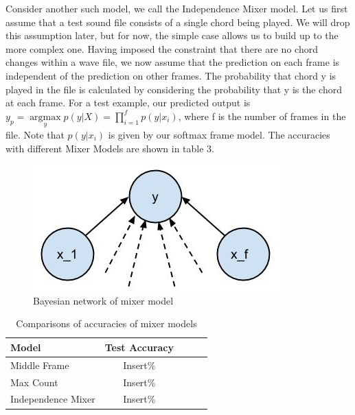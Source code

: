 \documentclass{article}
\begin{document}
Consider another such model, we call the Independence Mixer model. Let us first assume that a test sound file consists of a single chord being played. We will drop this assumption later, but for now, the simple case allows us to build up to the more complex one. Having imposed the constraint that there are no chord changes within a wave file, we now assume that the prediction on each frame is independent of the prediction on other frames. The probability that chord y is played in the file is calculated by considering the probability that y is the chord at each frame.  For a test example, our predicted output is $y_p = \underset{y}{\operatorname{argmax}} p(y | X) = \prod_{i=1}^fp(y | x_i)$, where f is the number of frames in the file. Note that $p(y | x_i)$ is given by our softmax frame model. The accuracies with different Mixer Models are shown in table 3.
\begin{figure}[ht]
\vskip 0.2in
\begin{center}
\centerline{\includegraphics[width=\columnwidth]{f1}}
\caption{Bayesian network of mixer model}
\label{icml-historical}
\end{center}
\vskip -0.2in
\end{figure}
\begin{table}[t]
\caption{Comparisons of accuracies of mixer models}
\label{mfccvschroma}
\vskip 0.15in
\begin{center}
\begin{small}
\begin{sc}
\begin{tabular}{lcccr}
\hline
\abovespace\belowspace
Model & Test Accuracy \\
\hline
\abovespace
Middle Frame    & Insert\%\\
Max Count & Insert\%\\
Independence Mixer & Insert\%\\
\hline
\end{tabular}
\end{sc}
\end{small}
\end{center}
\vskip -0.1in
\end{table}
\end{document}
